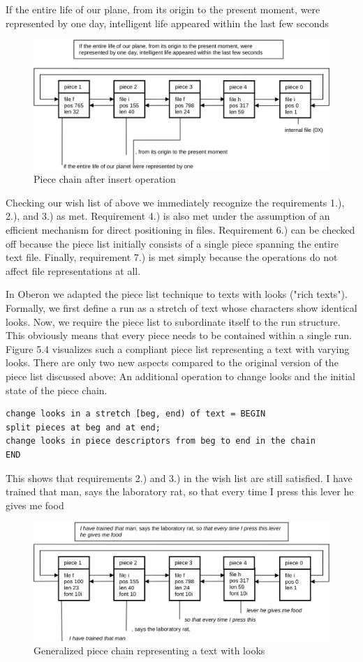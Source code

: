 If the entire life of our plane, from its origin to the present moment, were
represented by one day, intelligent life appeared within the last few seconds
\begin{figure}
	\label{fig:chain-after-insert}
	\centering
	\includegraphics[width=\textwidth]{i/f}
	\caption{Piece chain after insert operation}
\end{figure}

Checking our wish list of above we immediately recognize the requirements 1.), 2.), and 3.) as met.
Requirement 4.) is also met under the assumption of an efficient mechanism for direct positioning in
files. Requirement 6.) can be checked off because the piece list initially consists of a single piece
spanning the entire text file. Finally, requirement 7.) is met simply because the operations do not
affect file representations at all.

In Oberon we adapted the piece list technique to texts with looks ("rich texts"). Formally, we first
define a run as a stretch of text whose characters show identical looks. Now, we require the piece
list to subordinate itself to the run structure. This obviously means that every piece needs to be
contained within a single run. Figure 5.4 visualizes such a compliant piece list representing a text
with varying looks. There are only two new aspects compared to the original version of the piece list
discussed above: An additional operation to change looks and the initial state of the piece chain.
\begin{verbatim}
change looks in a stretch [beg, end) of text = BEGIN
split pieces at beg and at end;
change looks in piece descriptors from beg to end in the chain
END
\end{verbatim}
This shows that requirements 2.) and 3.) in the wish list are still satisfied.
I have trained that man, says the laboratory rat, so that every time I press this lever
he gives me food
\begin{figure}
	\label{fig:chain-generalized}
	\centering
	\includegraphics[width=\textwidth]{i/g}
	\caption{Generalized piece chain representing a text with looks}
\end{figure}


